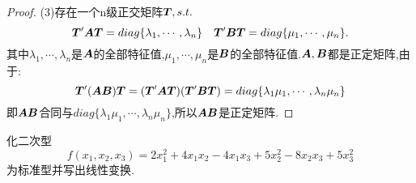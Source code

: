 \documentclass[lang=cn,11pt,normal]{elegantbook}
\begin{document}
	\begin{proof}
		(3)存在一个n级正交矩阵$\TT,s.t.$
		\begin{equation}
		\TT'\AA\TT=diag\{\lambda_1,\cdots,\lambda_n\}\quad\TT'\BB\TT=diag\{\mu_1,\cdots,\mu_n\}.
		\end{equation}
		其中$\lambda_1,\cdots,\lambda_n$是$\AA$的全部特征值,$\mu_1,\cdots,\mu_n$是$\BB$的全部特征值.$\AA,\BB$都是正定矩阵,由于:
		\begin{equation}
		\TT'(\AA\BB)\TT=(\TT'\AA\TT)(\TT'\BB\TT)=diag\{\lambda_1\mu_1,\cdots,\lambda_n\mu_n \}
		\end{equation}
		即$\AA\BB$合同与$diag\{\lambda_1\mu_1,\cdots,\lambda_n\mu_n \}$,所以$\AA\BB$是正定矩阵.
	\end{proof}
	\begin{exercise}
		化二次型
		\begin{equation}
		f(x_1,x_2,x_3)=2x_1^2+4x_1x_2-4x_1x_3+5x_2^2-8x_2x_3+5x_3^2
		\end{equation}
		为标准型并写出线性变换.
	\end{exercise}
\end{document}
